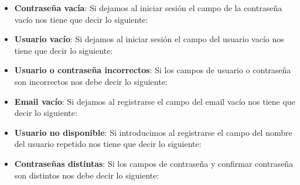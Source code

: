 \begin{itemize}
	\item \textbf{Contraseña vacía}: Si dejamos al iniciar sesión el campo de la contraseña vacío nos tiene que decir lo siguiente:
	\item \textbf{Usuario vacío}: Si dejamos al iniciar sesión el campo del usuario vacío nos tiene que decir lo siguiente:
	\item \textbf{Usuario o contraseña incorrectos}: Si los campos de usuario o contraseña son incorrectos nos debe decir lo siguiente:
	\item \textbf{Email vacío}: Si dejamos al registrarse el campo del email vacío nos tiene que decir lo siguiente:
	\item \textbf{Usuario no disponible}: Si introducimos al registrarse el campo del nombre del usuario repetido nos tiene que decir lo siguiente:
	\item \textbf{Contraseñas distintas}: Si los campos de contraseña y confirmar contraseña son distintos nos debe decir lo siguiente:
\end{itemize}